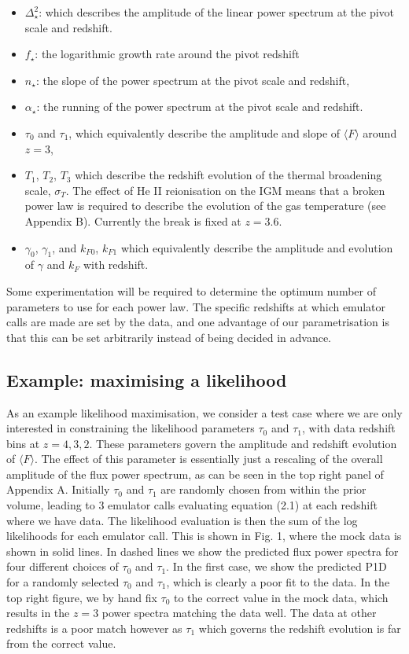 \documentclass[]{article}
\begin{document}
\begin{itemize}
    \item $\Delta^2_\star$: which describes the amplitude of the linear power spectrum at 
    the pivot scale and redshift.
    \item $f_\star$: the logarithmic growth rate around the pivot redshift
    \item $n_\star$: the slope of the power spectrum at the pivot scale and redshift,
    \item $\alpha_\star$: the running of the power spectrum at the pivot scale and redshift.
    \item  $\tau_0$ and $\tau_1$, which equivalently describe the amplitude and slope of $\langle F\rangle$ around $z=3$,
    \item  $T_1$, $T_2$, $T_3$ which describe the redshift evolution of the thermal 
    broadening scale, $\sigma_T$. The effect of He II reionisation on the IGM means that 
    a broken power law is required to describe the evolution of the gas temperature (see 
    Appendix B). Currently the break is fixed at $z=3.6$.
    \item $\gamma_0$, $\gamma_1$, and $k_{F0}$, $k_{F1}$ which equivalently describe the amplitude and evolution of $\gamma$ and $k_F$ with redshift.
\end{itemize}

\noindent Some experimentation will be required to determine the optimum number of 
parameters to use for each power law. The specific redshifts at which emulator calls are 
made are set by the data, and one advantage of our parametrisation is that this can be 
set arbitrarily instead of being decided in advance.

\subsection{Example: maximising a likelihood}
As an example likelihood maximisation, we consider a test case where we are only interested 
in constraining the likelihood parameters $\tau_0$ and $\tau_1$, with data redshift bins 
at $z=4,3,2$. These parameters govern the amplitude and redshift evolution of $\langle F\rangle$.
The effect of this parameter is essentially just a rescaling of the overall amplitude of the flux
power spectrum, as can be seen in the top right panel of Appendix A.
Initially $\tau_0$ and $\tau_1$ are randomly chosen from within the prior 
volume, leading to 3 emulator calls evaluating equation (2.1) at each redshift where we 
have data. The likelihood evaluation is then the sum of the log likelihoods for each 
emulator call. This is shown in Fig. 1, where the mock data is shown in solid lines.
In dashed lines we show the predicted flux power spectra for four different choices of
$\tau_0$ and $\tau_1$. In the first case, we show the predicted P1D for a randomly selected
$\tau_0$ and $\tau_1$, which is clearly a poor fit to the data. In the top right figure,
we by hand fix $\tau_0$ to the correct value in the mock data, which results in the
$z=3$ power spectra matching the data well. The data at other redshifts is a poor match
however as $\tau_1$ which governs the redshift evolution is far from the correct value.
\end{document}
